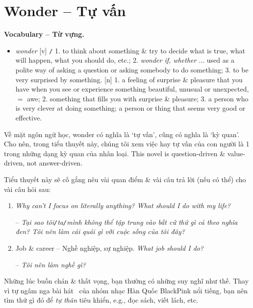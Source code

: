 \documentclass[12pt,twoside]{book}
\begin{document}
\section{Wonder -- Tự vấn}
\textbf{\textsf{\small Vocabulary -- Từ vựng.}}
\begin{itemize}\small\sf
	\item {\it wonder} [v] {\tt/} 1. to think about something \& try to decide what is true, what will happen, what you should do, etc.; 2. {\it wonder if, whether $\ldots$} used as a polite way of asking a question or asking somebody to do something; 3. to be very surprised by something. [n] 1. a feeling of surprise \& pleasure that you have when you see or experience something beautiful, unusual or unexpected, $=$ {\sf awe}; 2. something that fills you with surprise \& pleasure; 3. a person who is very clever at doing something; a person or thing that seems very good or effective.
\end{itemize}
Về mặt ngôn ngữ học, wonder có nghĩa là `tự vấn', cũng có nghĩa là `kỳ quan'. Cho nên, trong tiểu thuyết này, chúng tôi xem việc hay tự vấn của con người là 1 trong những dạng kỳ quan của nhân loại. This novel is question-driven \& value-driven, not answer-driven.

Tiểu thuyết này sẽ cố gắng nêu vài quan điểm \& vài câu trả lời (nếu có thể) cho vài câu hỏi sau:
\begin{enumerate}
	\item {\it Why can't I focus on literally anything? What should I do with my life?}
	
	-- {\it Tại sao tôi{\tt/}ta{\tt/}mình không thể tập trung vào bất cứ thứ gì cả theo nghĩa đen? Tôi nên làm cái quái gì với cuộc sống của tôi đây?}
	\item {\sf Job \& career -- Nghề nghiệp, sự nghiệp.} {\it What job should I do?}
	
	-- {\it Tôi nên làm nghề gì?}
\end{enumerate}
Những lúc buồn chán \& thất vọng, bạn thường có những suy nghĩ như thế. Thay vì tự ngâm nga bài hát \musEighth[\href{https://www.youtube.com/watch?v=bqzDuRz_P7g}{\it Don't Know What To Do}]\musEighth\ của nhóm nhạc Hàn Quốc {\sc BlackPink} nổi tiếng, bạn nên tìm thứ gì đó để {\it tự thân} tiêu khiển, e.g., đọc sách, viết lách, etc.

\end{document}
